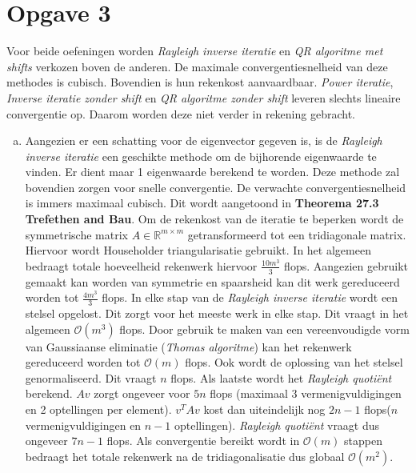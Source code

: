 \documentclass[a4paper]{article}
\newcommand{\opgave}[1]{\section*{Opgave #1}}
\begin{document}
\opgave{3}
Voor beide oefeningen worden \textit{Rayleigh inverse iteratie} en \textit{QR algoritme met shifts} verkozen boven de anderen. De maximale convergentiesnelheid van deze methodes is cubisch. Bovendien is hun rekenkost aanvaardbaar. \textit{Power iteratie}, \textit{Inverse iteratie zonder shift} en \textit{QR algoritme zonder shift} leveren slechts lineaire convergentie op. Daarom worden deze niet verder in rekening gebracht. 
\begin{enumerate}[a)] %
\item 
Aangezien er een schatting voor de eigenvector gegeven is, is de \textit{Rayleigh inverse iteratie} een geschikte methode om de bijhorende eigenwaarde te vinden. Er dient maar 1 eigenwaarde berekend te worden. Deze methode zal bovendien zorgen voor snelle convergentie. De verwachte convergentiesnelheid is immers maximaal cubisch. Dit wordt aangetoond in \textbf{Theorema 27.3 Trefethen and Bau}. Om de rekenkost van de iteratie te beperken wordt de symmetrische matrix $A \in \mathbb{R}^{m\times m}$ getransformeerd tot een tridiagonale matrix. Hiervoor wordt Householder triangularisatie gebruikt. In het algemeen bedraagt totale hoeveelheid rekenwerk hiervoor  $\frac{10m^{3}}{3}$ flops. Aangezien gebruikt gemaakt kan worden van symmetrie en spaarsheid kan dit werk gereduceerd worden tot $\frac{4m^{3}}{3}$ flops. In elke stap van de \textit{Rayleigh inverse iteratie} wordt een stelsel opgelost. Dit zorgt voor het meeste werk in elke stap. Dit vraagt in het algemeen $\mathcal{O} (m^3)$ flops. Door gebruik te maken van een vereenvoudigde vorm van Gaussiaanse eliminatie (\textit{Thomas algoritme}) kan het rekenwerk gereduceerd worden tot $\mathcal{O}(m)$ flops. Ook wordt de oplossing van het stelsel genormaliseerd. Dit vraagt $n$ flops. Als laatste wordt het \textit{Rayleigh quoti\"ent} berekend. $Av$ zorgt ongeveer voor $5n$ flops (maximaal 3 vermenigvuldigingen en 2 optellingen per element). $v^{T}Av$ kost dan uiteindelijk nog $2n-1$ flops($n$ vermenigvuldigingen en $n-1$ optellingen). \textit{Rayleigh quoti\"ent} vraagt dus ongeveer $7n-1$ flops. Als convergentie bereikt wordt in $\mathcal{O}(m)$ stappen bedraagt het totale rekenwerk na de tridiagonalisatie dus globaal $\mathcal{O} (m^2)$.


\end{enumerate}
\end{document}
